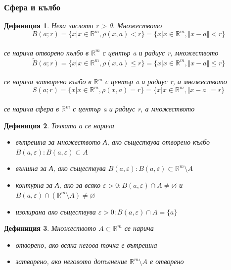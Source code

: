 \documentclass[a4paper,fleqn,12pt]{article}
\newtheorem{definition}{Дефиниция}[subsection]
\theoremstyle{definition}
\begin{document}
\subsubsection{Сфера и кълбо}

\begin{definition}
Нека числото r > 0. Множеството \\
$$B(a;r) = \{ x \vert  x \in \mathbb{R}^m, \rho(x,a) <r \} = \{ x\vert  x \in \mathbb{R}^m, \Vert x-a \Vert < r \}$$\\
се нарича отворено кълбо в $\mathbb{R}^m$ с център a и радиус r, множеството \\
$$\widetilde B(a;r) = \{ x \vert  x \in \mathbb{R}^m, \rho(x,a) \leq r \} = \{ x\vert  x \in \mathbb{R}^m, \Vert x-a \Vert \leq r \}$$\\
се нарича затворено кълбо в $\mathbb{R}^m$ с център a и радиус r, а множеството \\
$$S(a;r) = \{ x \vert  x \in \mathbb{R}^m, \rho(x,a) = r \} = \{ x\vert  x \in \mathbb{R}^m, \Vert x-a \Vert = r \}$$\\
се нарича сфера в $\mathbb{R}^m$ с център a и радиус r, а множеството \\
\end{definition}

\begin{definition}
Точката а се нарича
\begin{itemize}
	\item вътрешна за множеството А, ако съществува отворено кълбо $B(a,\varepsilon): B(a,\varepsilon) \subset A$
	\item външна за А, ако съществува $B(a,\varepsilon): B(a,\varepsilon) \subset \mathbb{R}^m \setminus  A$
	\item контурна за А, ако за всяко $\varepsilon > 0: B(a,\varepsilon) \cap A \neq \varnothing $ и \\ $ B(a,\varepsilon) \cap (\mathbb{R}^m \setminus  A) \neq \varnothing$
	\item изолирана ако съществува $\varepsilon > 0: B(a,\varepsilon) \cap A = \{ a \}$
\end{itemize}
	
\end{definition}

\begin{definition}
Множеството $A \subset \mathbb{R}^m $ се нарича 

\begin{itemize}
	\item отворено, ако всяка негова точка е вътрешна 
	\item затворено, ако неговото допълнение  $\mathbb{R}^m \setminus A$ е отворено
\end{itemize}

\end{definition}
\end{document}
